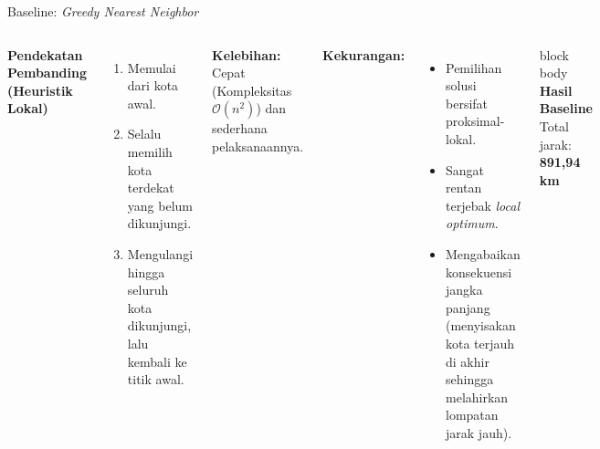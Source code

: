 \documentclass[aspectratio=169,10pt]{beamer}
\begin{document}
\begin{frame}{Baseline: \textit{Greedy Nearest Neighbor}}
  \begin{columns}[T]
    \textbf{Pendekatan Pembanding (Heuristik Lokal)}
    \begin{enumerate}
      \item Memulai dari kota awal.
      \item Selalu memilih kota terdekat yang belum dikunjungi.
      \item Mengulangi hingga seluruh kota dikunjungi, lalu kembali ke titik awal.
    \end{enumerate}
    
    \vspace{0.2cm}
    \textbf{Kelebihan:} Cepat (Kompleksitas $\mathcal{O}(n^2)$) dan sederhana pelaksanaannya.
    
    \vspace{0.2cm}
    \textbf{Kekurangan:}
    \begin{itemize}
      \item Pemilihan solusi bersifat proksimal-lokal.
      \item Sangat rentan terjebak \textit{local optimum}.
      \item Mengabaikan konsekuensi jangka panjang (menyisakan kota terjauh di akhir sehingga melahirkan lompatan jarak jauh).
    \end{itemize}
    
    \vspace{0.5cm}
    \begin{beamercolorbox}[wd=\linewidth,sep=12pt,rounded=true]{block body}
      \centering
      {\large\bfseries Hasil Baseline}\\[8pt]
      Total jarak: \textbf{\color{Sky} 891,94 km}
    \end{beamercolorbox}
  \end{columns}
\end{frame}
\end{document}
